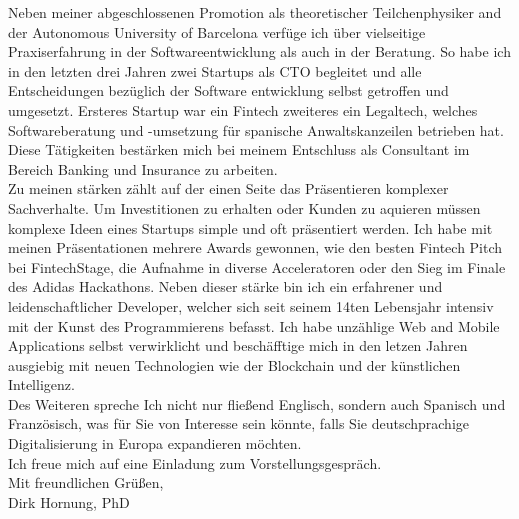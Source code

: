 \documentclass[11pt]{article}
\begin{document}
\noindent Neben meiner abgeschlossenen Promotion als theoretischer
Teilchenphysiker and der Autonomous University of Barcelona verfüge ich über
vielseitige Praxiserfahrung in der Softwareentwicklung als auch in der
Beratung. So habe ich in den letzten drei Jahren zwei Startups als CTO begleitet
und alle Entscheidungen bezüglich der Software entwicklung selbst getroffen und
umgesetzt. Ersteres Startup war ein Fintech zweiteres ein Legaltech, welches
Softwareberatung und -umsetzung für spanische Anwaltskanzeilen betrieben
hat. Diese Tätigkeiten bestärken mich bei meinem Entschluss als Consultant im
Bereich Banking und Insurance zu arbeiten. \\

\noindent Zu meinen stärken zählt auf der einen Seite das Präsentieren komplexer
Sachverhalte. Um Investitionen zu erhalten oder Kunden zu aquieren müssen
komplexe Ideen eines Startups simple und oft präsentiert werden. Ich habe mit
meinen Präsentationen mehrere Awards gewonnen, wie den besten Fintech Pitch bei
FintechStage, die Aufnahme in diverse Acceleratoren oder den Sieg im Finale des
Adidas Hackathons. Neben dieser stärke bin ich ein erfahrener und
leidenschaftlicher Developer, welcher sich seit seinem 14ten Lebensjahr intensiv
mit der Kunst des Programmierens befasst. Ich habe unzählige Web and Mobile
Applications selbst verwirklicht und beschäfftige mich in den letzen Jahren
ausgiebig mit neuen Technologien wie der Blockchain und der
künstlichen Intelligenz. \\

\noindent Des Weiteren spreche Ich nicht nur fließend Englisch, sondern auch Spanisch und
Französisch, was für Sie von Interesse sein könnte, falls Sie deutschprachige
Digitalisierung in Europa expandieren möchten. \\
 
\noindent Ich freue mich auf eine Einladung zum Vorstellungsgespräch. \\

\noindent Mit freundlichen Grüßen, \\
\noindent Dirk Hornung, PhD

 
\end{document}

